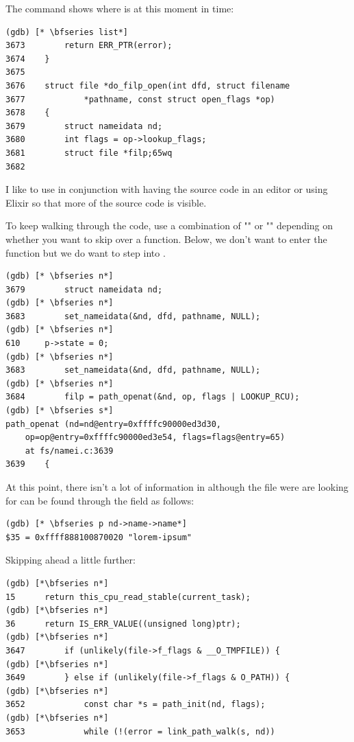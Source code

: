 \noindent
The  command shows where  is at this moment in time:

\begin{lstlisting}
(gdb) [* \bfseries list*]
3673		return ERR_PTR(error);
3674	}
3675	
3676	struct file *do_filp_open(int dfd, struct filename 
3677			*pathname, const struct open_flags *op)
3678	{
3679		struct nameidata nd;
3680		int flags = op->lookup_flags;
3681		struct file *filp;65wq	
3682	
\end{lstlisting}

\noindent
I like to use  in conjunction with having the source code in an editor or using Elixir so that more of the source code is visible.

To keep walking through the code, use a combination of "" or "" depending on whether you want to skip over a function. Below, we don't want to enter the function  but we do want to step into .

\begin{lstlisting}
(gdb) [* \bfseries n*]
3679		struct nameidata nd;
(gdb) [* \bfseries n*]
3683		set_nameidata(&nd, dfd, pathname, NULL);
(gdb) [* \bfseries n*]
610		p->state = 0;
(gdb) [* \bfseries n*]
3683		set_nameidata(&nd, dfd, pathname, NULL);
(gdb) [* \bfseries n*]
3684		filp = path_openat(&nd, op, flags | LOOKUP_RCU);
(gdb) [* \bfseries s*]
path_openat (nd=nd@entry=0xffffc90000ed3d30, 
    op=op@entry=0xffffc90000ed3e54, flags=flags@entry=65) 
    at fs/namei.c:3639
3639	{
\end{lstlisting}

\noindent
At this point, there isn't a lot of information in  although the file were are looking for can be found through the  field as follows:

\begin{lstlisting}
(gdb) [* \bfseries p nd->name->name*]
$35 = 0xffff888100870020 "lorem-ipsum"
\end{lstlisting}

\noindent
Skipping ahead a little further:

\begin{lstlisting}
(gdb) [*\bfseries n*]
15		return this_cpu_read_stable(current_task);
(gdb) [*\bfseries n*]
36		return IS_ERR_VALUE((unsigned long)ptr);
(gdb) [*\bfseries n*]
3647		if (unlikely(file->f_flags & __O_TMPFILE)) {
(gdb) [*\bfseries n*]
3649		} else if (unlikely(file->f_flags & O_PATH)) {
(gdb) [*\bfseries n*]
3652			const char *s = path_init(nd, flags);
(gdb) [*\bfseries n*]
3653			while (!(error = link_path_walk(s, nd))
\end{lstlisting}

